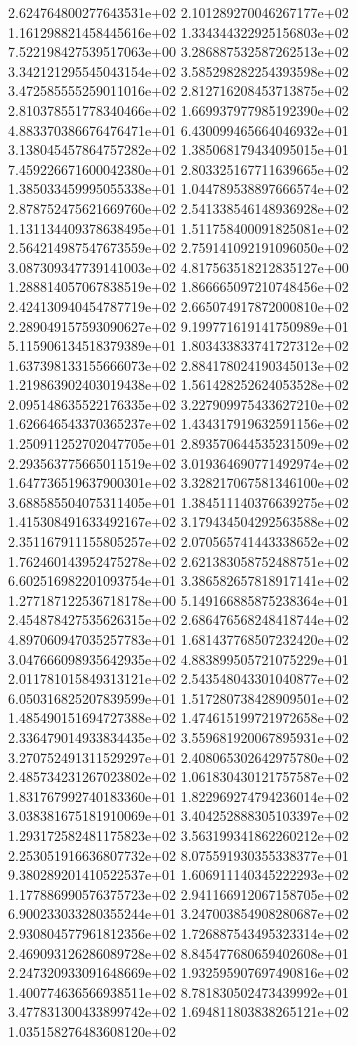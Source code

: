 2.624764800277643531e+02 2.101289270046267177e+02 1.161298821458445616e+02
1.334344322925156803e+02 7.522198427539517063e+00 3.286887532587262513e+02
3.342121295545043154e+02 3.585298282254393598e+02 3.472585555259011016e+02
2.812716208453713875e+02 2.810378551778340466e+02 1.669937977985192390e+02
4.883370386676476471e+01 6.430099465664046932e+01 3.138045457864757282e+02
1.385068179434095015e+01 7.459226671600042380e+01 2.803325167711639665e+02
1.385033459995055338e+01 1.044789538897666574e+02 2.878752475621669760e+02
2.541338546148936928e+02 1.131134409378638495e+01 1.511758400091825081e+02
2.564214987547673559e+02 2.759141092191096050e+02 3.087309347739141003e+02
4.817563518212835127e+00 1.288814057067838519e+02 1.866665097210748456e+02
2.424130940454787719e+02 2.665074917872000810e+02 2.289049157593090627e+02
9.199771619141750989e+01 5.115906134518379389e+01 1.803433833741727312e+02
1.637398133155666073e+02 2.884178024190345013e+02 1.219863902403019438e+02
1.561428252624053528e+02 2.095148635522176335e+02 3.227909975433627210e+02
1.626646543370365237e+02 1.434317919632591156e+02 1.250911252702047705e+01
2.893570644535231509e+02 2.293563775665011519e+02 3.019364690771492974e+02
1.647736519637900301e+02 3.328217067581346100e+02 3.688585504075311405e+01
1.384511140376639275e+02 1.415308491633492167e+02 3.179434504292563588e+02
2.351167911155805257e+02 2.070565741443338652e+02 1.762460143952475278e+02
2.621383058752488751e+02 6.602516982201093754e+01 3.386582657818917141e+02
1.277187122536718178e+00 5.149166885875238364e+01 2.454878427535626315e+02
2.686476568248418744e+02 4.897060947035257783e+01 1.681437768507232420e+02
3.047666098935642935e+02 4.883899505721075229e+01 2.011781015849313121e+02
2.543548043301040877e+02 6.050316825207839599e+01 1.517280738428909501e+02
1.485490151694727388e+02 1.474615199721972658e+02 2.336479014933834435e+02
3.559681920067895931e+02 3.270752491311529297e+01 2.408065302642975780e+02
2.485734231267023802e+02 1.061830430121757587e+02 1.831767992740183360e+01
1.822969274794236014e+02 3.038381675181910069e+01 3.404252888305103397e+02
1.293172582481175823e+02 3.563199341862260212e+02 2.253051916636807732e+02
8.075591930355338377e+01 9.380289201410522537e+01 1.606911140345222293e+02
1.177886990576375723e+02 2.941166912067158705e+02 6.900233033280355244e+01
3.247003854908280687e+02 2.930804577961812356e+02 1.726887543495323314e+02
2.469093126286089728e+02 8.845477680659402608e+01 2.247320933091648669e+02
1.932595907697490816e+02 1.400774636566938511e+02 8.781830502473439992e+01
3.477831300433899742e+02 1.694811803838265121e+02 1.035158276483608120e+02
